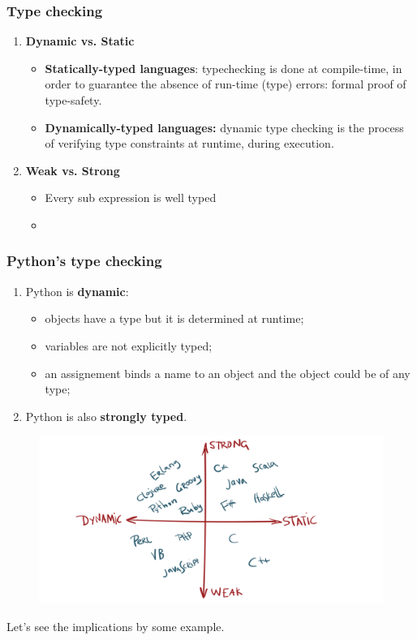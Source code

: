 \documentclass[xcolor ={table,usenames,dvipsnames}]{beamer}
\theoremstyle{definition}
\begin{document}
	\begin{frame}
		\frametitle{Type checking  }
		\begin{enumerate}
			\item \textbf{Dynamic vs. Static}\begin{itemize}
				\item \textbf{Statically-typed languages}: typechecking is done at
				compile-time, in order to guarantee the absence of run-time (type) errors:
				formal proof of type-safety.
				\item \textbf{Dynamically-typed languages:} dynamic
				type checking is the process of verifying type constraints at runtime,
				during execution.
			\end{itemize}
			\item \textbf{Weak vs. Strong}\begin{itemize}
				\item Every sub expression is well typed
				\item 
			\end{itemize}
		\end{enumerate}
	\end{frame}

	\begin{frame}
		\frametitle{Python's type checking}
			\begin{enumerate}
				\item Python is \textbf{dynamic}: 
				\begin{itemize}
					\item objects have a type but it is determined at runtime;
					\item variables are not explicitly typed;
					\item an assignement binds a name to an object and the object could be of any type;
				\end{itemize}
				\item Python is also \textbf{strongly typed}.
			\end{enumerate}
			\begin{figure}[h!]
				\centering
				\includegraphics[scale=0.14]{img/classification.png}
			\end{figure}
			Let's see the implications by some example.
	\end{frame}
\end{document}
